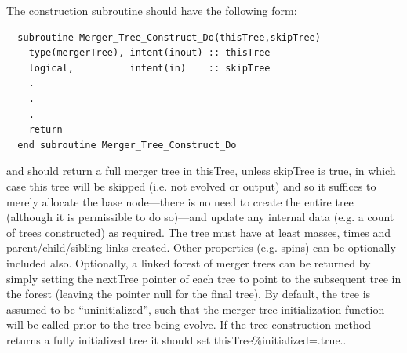 The construction subroutine should have the following form:
\begin{verbatim}
  subroutine Merger_Tree_Construct_Do(thisTree,skipTree)
    type(mergerTree), intent(inout) :: thisTree
    logical,          intent(in)    :: skipTree
    .
    .
    .
    return
  end subroutine Merger_Tree_Construct_Do
\end{verbatim}
and should return a full merger tree in {\normalfont \ttfamily thisTree}, unless {\normalfont \ttfamily skipTree} is true, in which case this tree will be skipped (i.e. not evolved or output) and so it suffices to merely allocate the base node---there is no need to create the entire tree (although it is permissible to do so)---and update any internal data (e.g. a count of trees constructed) as required. The tree must have at least masses, times and parent/child/sibling links created. Other properties (e.g. spins) can be optionally included also. Optionally, a linked forest of merger trees can be returned by simply setting the {\normalfont \ttfamily nextTree} pointer of each tree to point to the subsequent tree in the forest (leaving the pointer {\normalfont \ttfamily null} for the final tree). By default, the tree is assumed to be ``uninitialized'', such that the merger tree initialization function will be called prior to the tree being evolve. If the tree construction method returns a fully initialized tree it should set {\normalfont \ttfamily thisTree\%initialized=.true.}.

